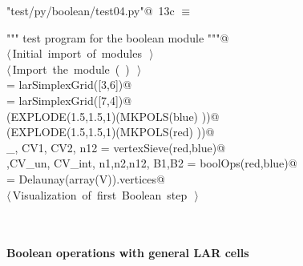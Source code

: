 \documentclass[11pt,oneside]{article}	%
\begin{document}
\begin{flushleft} \small
\begin{minipage}{\linewidth} \label{scrap22}
\protect{}\verb@"test/py/boolean/test04.py"@\nobreak\ {\footnotesize 13c }$\equiv$
\vspace{-1ex}
\begin{list}{}{} \item
\mbox{}\verb@""" test program for the boolean module """@\\
\mbox{}\verb@@\hbox{$\langle\,$Initial import of modules\nobreak\ {\footnotesize {}}$\,\rangle$}\verb@@\\
\mbox{}\verb@@\hbox{$\langle\,$Import the module\nobreak\ ({\footnotesize {}\label{scrap23}
 }\mbox{}\verb@boolean@ ) {\footnotesize {}}$\,\rangle$}\verb@@\\
\mbox{}\verb@blue = larSimplexGrid([3,6])@\\
\mbox{}\verb@red = larSimplexGrid([7,4])@\\
\mbox{}\verb@VIEW(EXPLODE(1.5,1.5,1)(MKPOLS(blue) ))@\\
\mbox{}\verb@VIEW(EXPLODE(1.5,1.5,1)(MKPOLS(red) ))@\\
\mbox{}\verb@_, CV1, CV2, n12 = vertexSieve(red,blue)@\\
\mbox{}\verb@V,CV_un, CV_int, n1,n2,n12, B1,B2 = boolOps(red,blue)@\\
\mbox{}\verb@CV = Delaunay(array(V)).vertices@\\
\mbox{}\verb@@\hbox{$\langle\,$Visualization of first Boolean step\nobreak\ {\footnotesize {}}$\,\rangle$}\verb@@\\
\mbox{}\verb@@{\NWsep}
\end{list}
\vspace{-2ex}
\end{minipage}\\[4ex]
\end{flushleft}

\paragraph{Boolean operations with general LAR cells}
\end{document}
